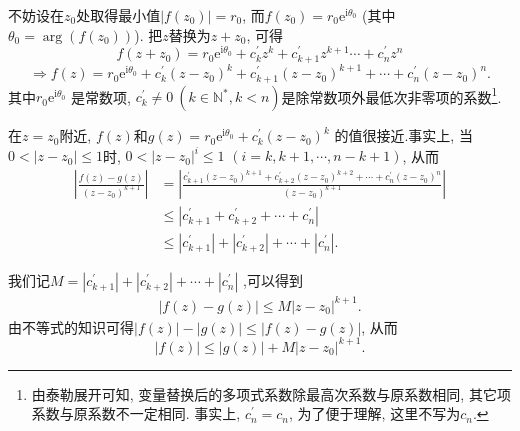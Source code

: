 \documentclass[12pt,a4paper]{ctexart}
\begin{document}
不妨设在$z_0$处取得最小值$|f(z_0)| = r_0$, 而$f(z_0) = r_0 \mathrm{e}^{\mathrm{i}\theta_0}$
(其中$\theta_0 = \arg(f(z_0))$). 把$z$替换为$z + z_0$, 可得
$$
    f(z+z_0)          = r_0 \mathrm{e}^{\mathrm{i}\theta_0} + c_k^{\prime} z^k + c_{k+1}^{\prime} z^{k+1}\cdots + c_n^{\prime}z^n $$ $$
    \Rightarrow f(z)  = r_0 \mathrm{e}^{\mathrm{i}\theta_0} + c_k^{\prime} (z-z_0)^{k} + c_{k+1}^{\prime} (z-z_0)^{k+1} + \cdots + c_n^{\prime} (z-z_0)^n.
$$
其中$r_0 \mathrm{e}^{\mathrm{i}\theta_0}$
是常数项, $c_k^{\prime} \neq 0\ (k\in \mathbb{N}^*, k<n)$是除常数项外最低次非零项的系数\footnote{由泰勒展开可知, 变量替换后的多项式系数除最高次系数与原系数相同, 其它项系数与原系数不一定相同. 事实上, $c^{\prime}_n = c_n$, 为了便于理解, 这里不写为$c_n$.}.

在$z = z_0$附近, $f(z)$和$g(z) = r_0 \mathrm{e}^{\mathrm{i}\theta_0} + c_k^{\prime} (z-z_0)^k$
的值很接近.事实上, 当$0 < |z-z_0| \leqslant 1$时, $0 < |z-z_0|^i \leqslant 1$ $(i = k, k+1,\cdots,n-k+1)$,
从而
\setlength{\abovedisplayskip}{15pt}
\setlength{\belowdisplayskip}{5pt}
\begin{align*}
    \left\lvert \frac{f(z)-g(z)}{(z-z_0)^{k+1}} \right\rvert & = \left\lvert \frac{c_{k+1}^{\prime} (z-z_0)^{k+1} + c_{k+2}^{\prime} (z-z_0)^{k+2} + \cdots +c_{n}^{\prime} (z-z_0)^{n}}{(z-z_0)^{k+1}}\right\rvert \\
                                                             & \leqslant \left\lvert c^{\prime}_{k+1} + c^{\prime}_{k+2} + \cdots + c_n^{\prime} \right\rvert                                                       \\
                                                             & \leqslant \left\lvert c_{k+1}^{\prime} \right\rvert + \left\lvert c_{k+2}^{\prime} \right\rvert + \cdots + \left\lvert c_{n}^{\prime} \right\rvert.
\end{align*}

\setlength{\abovedisplayskip}{3pt}
\setlength{\belowdisplayskip}{3pt}

我们记$M = \left\lvert c_{k+1}^{\prime} \right\rvert + \left\lvert c_{k+2}^{\prime} \right\rvert + \cdots + \left\lvert c_{n}^{\prime} \right\rvert$
,可以得到
\begin{align*}
    \left\lvert f(z)-g(z) \right\rvert \leqslant M |z-z_0|^{k+1}.
\end{align*}
由不等式的知识可得$|f(z)|-|g(z)|\leqslant |f(z)-g(z)|$, 从而
$$\left\lvert f(z) \right\rvert \leqslant |g(z)| + M|z-z_0|^{k+1}.$$
\end{document}
